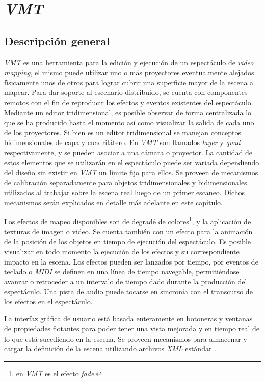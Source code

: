 \chapter{\emph{VMT}}
\section{Descripción general}
\emph{VMT} es una herramienta para la edición y ejecución de un espectáculo de \emph{video mapping}, el mismo puede utilizar uno o más proyectores eventualmente alejados físicamente unos de otros para lograr cubrir una superficie mayor de la escena a mapear. Para dar soporte al escenario distribuido, se cuenta con componentes remotos con el fin de reproducir los efectos y eventos existentes del espectáculo. Mediante un editor tridimensional, es posible observar de forma centralizada lo que se ha producido hasta el momento así como visualizar la salida de cada uno de los proyectores. Si bien es un editor tridimensional se manejan conceptos bidimensionales de capa y cuadrilátero. En \emph{VMT} son llamados \emph{layer} y \emph{quad} respectivamente, y se pueden asociar a una cámara o proyector. La cantidad de estos elementos que se utilizarán en el espectáculo puede ser variada dependiendo del diseño sin existir en \emph{VMT} un límite fijo para ellos. Se proveen de mecanismos de calibración separadamente para objetos tridimensionales y bidimensionales utilizados al trabajar sobre la escena real luego de un primer escaneo. Dichos mecanismos serán explicados en detalle más adelante en este capítulo.

Los efectos de mapeo disponibles son de degradé de colores\footnote{en \emph{VMT} es el efecto \emph{fade}.}, y la aplicación de texturas de imagen o video. Se cuenta también con un efecto para la animación de la posición de los objetos en tiempo de ejecución del espectáculo. Es posible visualizar en todo momento la ejecución de los efectos y su correspondiente impacto en la escena. Los efectos pueden ser lanzados por tiempo, por eventos de teclado o \emph{MIDI} se definen en una línea de tiempo navegable, permitiéndose avanzar o retroceder a un intervalo de tiempo dado durante la producción del espectáculo. Una pista de audio puede tocarse en sincronía con el transcurso de los efectos en el espectáculo.

La interfaz gráfica de usuario está basada enteramente en botoneras y ventanas de propiedades flotantes para poder tener una vista mejorada y en tiempo real de lo que está sucediendo en la escena. Se proveen mecanismos para almacenar y cargar la definición de la escena utilizando archivos \emph{XML} estándar .

